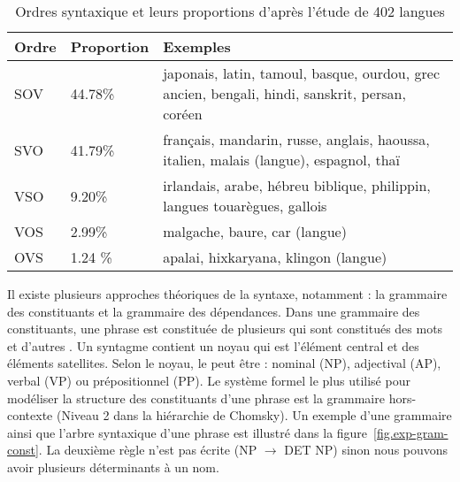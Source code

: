 \documentclass{KodeBook}
\begin{document}
\begin{table}[ht]
	\centering
	\begin{tabular}{p{}p{}p{}}
		\hline\hline 
		\textbf{Ordre} & \textbf{Proportion} & \textbf{Exemples} \\
		\hline
		SOV & 44.78\% & japonais, latin, tamoul, basque, ourdou, grec ancien, bengali, hindi, sanskrit, persan, coréen \\
		SVO & 41.79\% & français, mandarin, russe, anglais, haoussa, italien, malais (langue), espagnol, thaï \\
		VSO & 9.20\% & irlandais, arabe, hébreu biblique, philippin, langues touarègues, gallois \\
		VOS & 2.99\% & malgache, baure, car (langue) \\
		OVS & 1.24 \% & apalai, hixkaryana, klingon (langue) \\
		\hline\hline
	\end{tabular}
	\caption[Ordres syntaxiques et leurs proportions d'après l'étude de 402 langues]{Ordres syntaxique et leurs proportions d'après l'étude de 402 langues \cite{1988-blake}}
	\label{tab:ordre}
\end{table}

Il existe plusieurs approches théoriques de la syntaxe, notamment : la grammaire des constituants et la grammaire des dépendances. 
Dans une grammaire des constituants, une phrase est constituée de plusieurs  qui sont constitués des mots et d'autres .
Un syntagme contient un noyau qui est l'élément central et des éléments satellites.
Selon le noyau, le  peut être : nominal (NP), adjectival (AP), verbal (VP) ou prépositionnel (PP).
Le système formel le plus utilisé pour modéliser la structure des constituants d'une phrase est la grammaire hors-contexte (Niveau 2 dans la hiérarchie de Chomsky).
Un exemple d'une grammaire ainsi que l'arbre syntaxique d'une phrase est illustré dans la figure~\ref{fig.exp-gram-const}.
La deuxième règle n'est pas écrite (NP $ \rightarrow $ DET NP) sinon nous pouvons avoir plusieurs déterminants à un nom.
\end{document}
